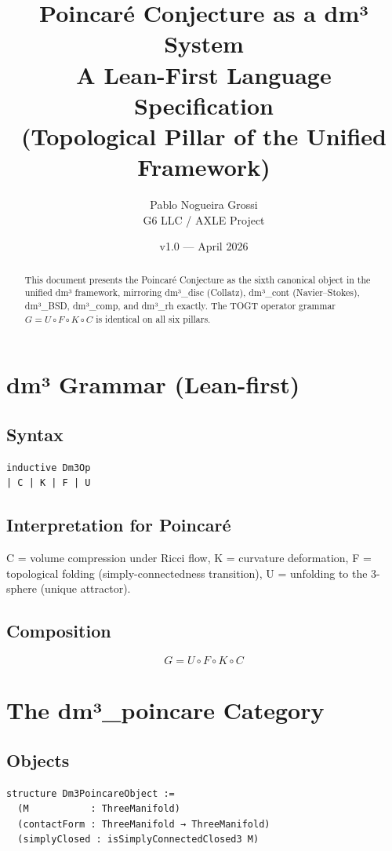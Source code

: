 \documentclass[11pt,a4paper]{article}
\title{\textbf{Poincaré Conjecture as a dm³ System}\\
A Lean-First Language Specification \\
(Topological Pillar of the Unified Framework)}
\author{Pablo Nogueira Grossi \\ G6 LLC / AXLE Project}
\date{v1.0 — April 2026}
\begin{document}
\maketitle

\begin{abstract}
This document presents the Poincaré Conjecture as the sixth canonical object in the unified dm³ framework, mirroring dm³\_disc (Collatz), dm³\_cont (Navier–Stokes), dm³\_BSD, dm³\_comp, and dm³\_rh exactly. The TOGT operator grammar \(G = U \circ F \circ K \circ C\) is identical on all six pillars.
\end{abstract}

\section{dm³ Grammar (Lean-first)}

\subsection{Syntax}
\begin{lstlisting}
inductive Dm3Op
| C | K | F | U
\end{lstlisting}

\subsection{Interpretation for Poincaré}
C = volume compression under Ricci flow,  
K = curvature deformation,  
F = topological folding (simply-connectedness transition),  
U = unfolding to the 3-sphere (unique attractor).

\subsection{Composition}
\[
G = U \circ F \circ K \circ C
\]

\section{The dm³\_poincare Category}

\subsection{Objects}
\begin{lstlisting}
structure Dm3PoincareObject :=
  (M           : ThreeManifold)
  (contactForm : ThreeManifold → ThreeManifold)
  (simplyClosed : isSimplyConnectedClosed3 M)
\end{lstlisting}
\end{document}
